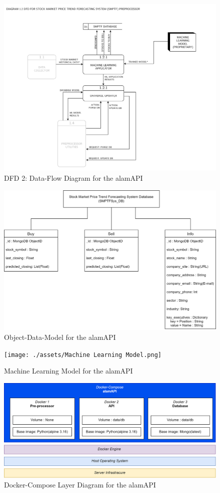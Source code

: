 \begin{figure}
    \centering
    \includegraphics[width=1\textwidth]{./assets/Data Flow Diagram-05.png}
    \caption{DFD 2: Data-Flow Diagram for the alamAPI}
    \label{fig:dfd2}
\end{figure}

\begin{figure}
    \centering
    \includegraphics[width=1\textwidth]{./assets/ODM.png}
    \caption{Object-Data-Model for the alamAPI}
    \label{fig:odm}
\end{figure}

\begin{figure}
    \centering
    \texttt{[image: ./assets/Machine Learning Model.png]}
    \caption{Machine Learning Model for the alamAPI}
    \label{fig:ml_model}
\end{figure}

\begin{figure}
    \centering
    \includegraphics[width=1\textwidth]{./assets/Docker-Compose Layout.png}
    \caption{Docker-Compose Layer Diagram for the alamAPI}
    \label{fig:docker_compose_layout}
\end{figure}